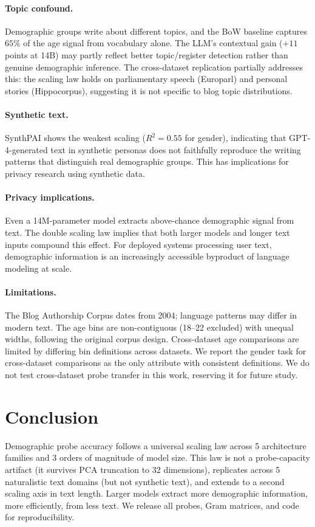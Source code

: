 \documentclass{article}
\begin{document}
\paragraph{Topic confound.} Demographic groups write about different topics, and the BoW baseline captures $65\%$ of the age signal from vocabulary alone. The LLM's contextual gain ($+11$ points at 14B) may partly reflect better topic/register detection rather than genuine demographic inference. The cross-dataset replication partially addresses this: the scaling law holds on parliamentary speech (Europarl) and personal stories (Hippocorpus), suggesting it is not specific to blog topic distributions.

\paragraph{Synthetic text.} SynthPAI shows the weakest scaling ($R^2\!=\!0.55$ for gender), indicating that GPT-4-generated text in synthetic personas does not faithfully reproduce the writing patterns that distinguish real demographic groups. This has implications for privacy research using synthetic data.

\paragraph{Privacy implications.} Even a 14M-parameter model extracts above-chance demographic signal from text. The double scaling law implies that both larger models and longer text inputs compound this effect. For deployed systems processing user text, demographic information is an increasingly accessible byproduct of language modeling at scale.

\paragraph{Limitations.} The Blog Authorship Corpus dates from 2004; language patterns may differ in modern text. The age bins are non-contiguous (18--22 excluded) with unequal widths, following the original corpus design. Cross-dataset age comparisons are limited by differing bin definitions across datasets. We report the gender task for cross-dataset comparisons as the only attribute with consistent definitions. We do not test cross-dataset probe transfer in this work, reserving it for future study.

\section{Conclusion}

Demographic probe accuracy follows a universal scaling law across 5 architecture families and 3 orders of magnitude of model size. This law is not a probe-capacity artifact (it survives PCA truncation to 32 dimensions), replicates across 5 naturalistic text domains (but not synthetic text), and extends to a second scaling axis in text length. Larger models extract more demographic information, more efficiently, from less text. We release all probes, Gram matrices, and code for reproducibility.



\end{document}
